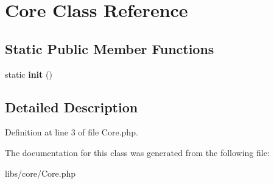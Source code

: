 \hypertarget{class_core}{\section{\-Core \-Class \-Reference}
\label{class_core}
}
\subsection*{\-Static \-Public \-Member \-Functions}
\begin{DoxyCompactItemize}
\item 
\hypertarget{class_core_a9f0be6ae273d3669e11c29910a0be338}{static {\bfseries init} ()}\label{class_core_a9f0be6ae273d3669e11c29910a0be338}

\end{DoxyCompactItemize}


\subsection{\-Detailed \-Description}


\-Definition at line 3 of file \-Core.\-php.



\-The documentation for this class was generated from the following file\-:\begin{DoxyCompactItemize}
\item 
libs/core/\-Core.\-php\end{DoxyCompactItemize}
